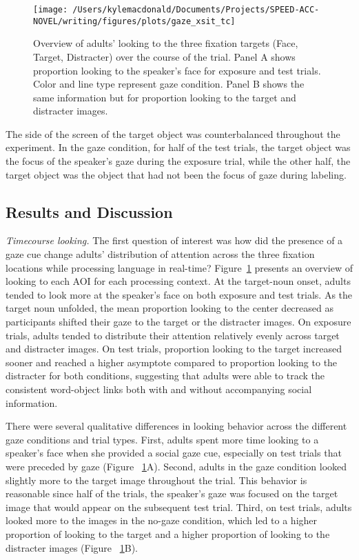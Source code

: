\documentclass[man,floatsintext]{apa6}
\begin{document}
\begin{figure}[!t]

{\centering \texttt{[image: /Users/kylemacdonald/Documents/Projects/SPEED-ACC-NOVEL/writing/figures/plots/gaze\_xsit\_tc]} 

}

\caption{Overview of adults' looking to the three fixation targets (Face, Target, Distracter) over the course of the trial. Panel A shows proportion looking to the speaker's face for exposure and test trials. Color and line type represent gaze condition. Panel B shows the same information but for proportion looking to the target and distracter images.}\label{fig:gaze-xsit-tc-plot}
\end{figure}

The side of the screen of the target object was counterbalanced
throughout the experiment. In the gaze condition, for half of the test
trials, the target object was the focus of the speaker's gaze during the
exposure trial, while the other half, the target object was the object
that had not been the focus of gaze during labeling.

\subsection{Results and Discussion}\label{results-and-discussion-1}

\emph{Timecourse looking.} The first question of interest was how did
the presence of a gaze cue change adults' distribution of attention
across the three fixation locations while processing language in
real-time? Figure~\ref{fig:gaze-xsit-tc-plot} presents an overview of
looking to each AOI for each processing context. At the target-noun
onset, adults tended to look more at the speaker's face on both exposure
and test trials. As the target noun unfolded, the mean proportion
looking to the center decreased as participants shifted their gaze to
the target or the distracter images. On exposure trials, adults tended
to distribute their attention relatively evenly across target and
distracter images. On test trials, proportion looking to the target
increased sooner and reached a higher asymptote compared to proportion
looking to the distracter for both conditions, suggesting that adults
were able to track the consistent word-object links both with and
without accompanying social information.

There were several qualitative differences in looking behavior across
the different gaze conditions and trial types. First, adults spent more
time looking to a speaker's face when she provided a social gaze cue,
especially on test trials that were preceded by gaze (Figure
~\ref{fig:gaze-xsit-tc-plot}A). Second, adults in the gaze condition
looked slightly more to the target image throughout the trial. This
behavior is reasonable since half of the trials, the speaker's gaze was
focused on the target image that would appear on the subsequent test
trial. Third, on test trials, adults looked more to the images in the
no-gaze condition, which led to a higher proportion of looking to the
target and a higher proportion of looking to the distracter images
(Figure ~\ref{fig:gaze-xsit-tc-plot}B).
\end{document}
